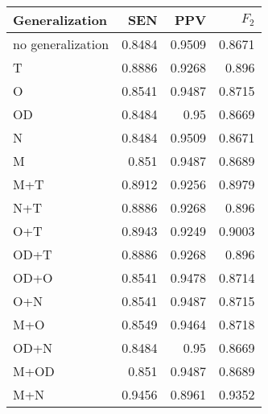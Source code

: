 \begin{table}[htbp]
  \caption{}
  \label{tab:}
  \centering
  \begin{tabular}[h]{@{}lrrr@{}}
    \toprule
    Generalization & SEN & PPV & \(F_2\) \\
    \midrule
no generalization	&	0.8484	&	0.9509	&	0.8671 \\
T	&	0.8886	&	0.9268	&	0.896 \\
O	&	0.8541	&	0.9487	&	0.8715 \\
OD	&	0.8484	&	0.95	&	0.8669 \\
N	&	0.8484	&	0.9509	&	0.8671 \\
M	&	0.851	&	0.9487	&	0.8689 \\
M+T	&	0.8912	&	0.9256	&	0.8979 \\
N+T	&	0.8886	&	0.9268	&	0.896 \\
O+T	&	0.8943	&	0.9249	&	0.9003 \\
OD+T	&	0.8886	&	0.9268	&	0.896 \\
OD+O	&	0.8541	&	0.9478	&	0.8714 \\
O+N	&	0.8541	&	0.9487	&	0.8715 \\
M+O	&	0.8549	&	0.9464	&	0.8718 \\
OD+N	&	0.8484	&	0.95	&	0.8669 \\
M+OD	&	0.851	&	0.9487	&	0.8689 \\
M+N	&	0.9456	&	0.8961	&	0.9352 \\
    \bottomrule
  \end{tabular}
\end{table}
